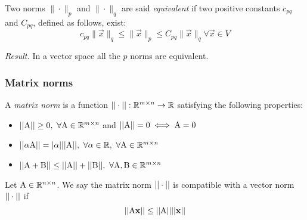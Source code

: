 
\begin{definition}
    Two norms $\|{\cdot}\|_p $ and $\|{\cdot}\|_q $ are said \textit{equivalent} if two positive constants $c_{pq}$ and $C_{pq}$, defined as follows, exist:
    $$c_{pq} \|\vec{x}\|_q\leq \|\vec{x}\|_p \leq C_{pq}\|\vec{x}\|_q \forall \vec{x} \in V$$
\end{definition}

\textit{Result.} In a vector space all the $p$ norms are equivalent.

\subsubsection{Matrix norms}

\begin{definition}
    A \textit{matrix norm} is a function $||\cdot||: \mathbb{R}^{m \times n} \rightarrow \mathbb{R}$ satisfying the following properties:
    \begin{itemize}
        \item $||\mathrm{A}|| \geq 0,\ \forall \mathrm{A} \in \mathbb{R}^{m \times n}$ and $||\mathrm{A}|| = 0 \iff \mathrm{A} = \mathrm{0}$
        \item $||\alpha\mathrm{A}|| = |\alpha|||\mathrm{A}||,\ \forall \alpha \in \mathbb{R},\ \forall \mathrm{A} \in \mathbb{R}^{m \times n}$
        \item $||\mathrm{A} + \mathrm{B}|| \leq ||\mathrm{A}|| + ||\mathrm{B}||,\ \forall \mathrm{A}, \mathrm{B} \in \mathbb{R}^{m \times n}$
    \end{itemize}
\end{definition}

\begin{definition}
    Let $\mathrm{A} \in \mathbb{R}^{n \times n}$. We say the matrix norm $||\cdot||$ is compatible with a vector norm $||\cdot||$ if
    $$||\mathrm{A}\mathbf{x}|| \leq ||\mathrm{A}||||\mathbf{x}||$$
\end{definition}









 
